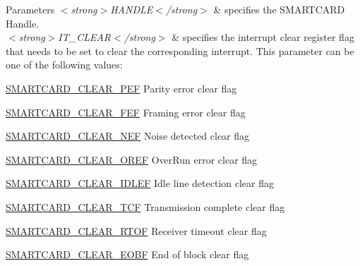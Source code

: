 \begin{DoxyParams}{Parameters}
{\em $<$strong$>$\+H\+A\+N\+D\+L\+E$<$/strong$>$} & specifies the S\+M\+A\+R\+T\+C\+A\+RD Handle. \\
\hline
{\em $<$strong$>$\+I\+T\+\_\+\+C\+L\+E\+A\+R$<$/strong$>$} & specifies the interrupt clear register flag that needs to be set to clear the corresponding interrupt. This parameter can be one of the following values\+: \begin{DoxyItemize}
\item \hyperlink{group___s_m_a_r_t_c_a_r_d___i_t___c_l_e_a_r___flags_gad589617040e5f426122a23364c377da2}{S\+M\+A\+R\+T\+C\+A\+R\+D\+\_\+\+C\+L\+E\+A\+R\+\_\+\+P\+EF} Parity error clear flag \item \hyperlink{group___s_m_a_r_t_c_a_r_d___i_t___c_l_e_a_r___flags_ga3aa5dfa08809a2c1e8cb9f44d3132cc5}{S\+M\+A\+R\+T\+C\+A\+R\+D\+\_\+\+C\+L\+E\+A\+R\+\_\+\+F\+EF} Framing error clear flag \item \hyperlink{group___s_m_a_r_t_c_a_r_d___i_t___c_l_e_a_r___flags_gad462b01ea8cec6eee50e467cec74d864}{S\+M\+A\+R\+T\+C\+A\+R\+D\+\_\+\+C\+L\+E\+A\+R\+\_\+\+N\+EF} Noise detected clear flag \item \hyperlink{group___s_m_a_r_t_c_a_r_d___i_t___c_l_e_a_r___flags_ga8ea1dbe61667748016c1d54bb7192f3f}{S\+M\+A\+R\+T\+C\+A\+R\+D\+\_\+\+C\+L\+E\+A\+R\+\_\+\+O\+R\+EF} Over\+Run error clear flag \item \hyperlink{group___s_m_a_r_t_c_a_r_d___i_t___c_l_e_a_r___flags_ga2f66ef3a43399ba852140a257472f3a1}{S\+M\+A\+R\+T\+C\+A\+R\+D\+\_\+\+C\+L\+E\+A\+R\+\_\+\+I\+D\+L\+EF} Idle line detection clear flag \item \hyperlink{group___s_m_a_r_t_c_a_r_d___i_t___c_l_e_a_r___flags_gad402907f3dc6986bf059ccaa96d27046}{S\+M\+A\+R\+T\+C\+A\+R\+D\+\_\+\+C\+L\+E\+A\+R\+\_\+\+T\+CF} Transmission complete clear flag \item \hyperlink{group___s_m_a_r_t_c_a_r_d___i_t___c_l_e_a_r___flags_ga062da53f5b3be6f682fda0ab5ee6fad3}{S\+M\+A\+R\+T\+C\+A\+R\+D\+\_\+\+C\+L\+E\+A\+R\+\_\+\+R\+T\+OF} Receiver timeout clear flag \item \hyperlink{group___s_m_a_r_t_c_a_r_d___i_t___c_l_e_a_r___flags_ga6ab02ae91a60fc87a1d80a68fb53a765}{S\+M\+A\+R\+T\+C\+A\+R\+D\+\_\+\+C\+L\+E\+A\+R\+\_\+\+E\+O\+BF} End of block clear flag \end{DoxyItemize}
\\
\hline
\end{DoxyParams}

